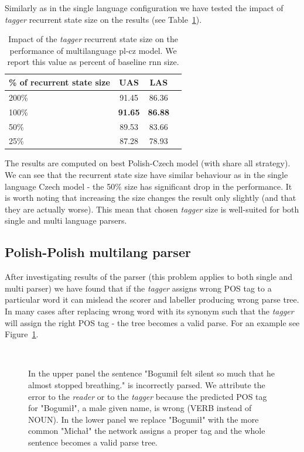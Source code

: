 Similarly as in the single language configuration we have tested the impact of \emph{tagger}
recurrent state size on the results (see Table~\ref{tab:birnn_multi_size}).

\begin{table}[!htbp]
    \centering
    \begin{tabular}{l c c c}
        \% of recurrent state size & UAS & LAS \\ \hline 
        200\% & 91.45 & 86.36\\
        100\% & \textbf{91.65} & \textbf{86.88}\\
        50\% & 89.53 & 83.66\\
        25\% & 87.28 & 78.93
    \end{tabular}
    \label{tab:birnn_multi_size}
    \caption{Impact of the \emph{tagger} recurrent state size on the performance
    of multilanguage pl-cz model.
    We report this value as percent of baseline rnn size.}
\end{table}

The results are computed on best Polish-Czech model (with share all strategy). We can see
that the recurrent state size have similar behaviour as in the single language Czech model - 
the 50\% size has significant drop in the performance. It is worth noting that
increasing the size changes the result only slightly (and that they are actually worse).
This mean that chosen \emph{tagger} size is well-suited for both single and multi
language parsers.

\subsection{Polish-Polish multilang parser}
After investigating results of the parser (this problem applies to both single
and multi parser) we have found that if the \emph{tagger} assigns wrong POS tag to
a particular word it can mislead the scorer and labeller producing wrong parse tree.
In many cases after replacing wrong word with its synonym such that the \emph{tagger}
will assign the right POS tag - the tree becomes a valid parse. For an example see Figure~\ref{fig:pos_bad_good}.

\begin{figure}[htbp]
  \centering
  \\[5pt]
  \caption{In the upper panel the sentence "Bogumił felt silent so
    much that he almost stopped breathing." is incorrectly parsed.
    We attribute the error to the \emph{reader} or to the \emph{tagger} because the predicted POS
    tag for "Bogumił", a male given name, is wrong (VERB instead of
    NOUN). In the lower panel we replace "Bogumił" with the  more common "Michał" the network assigns
    a proper tag and the whole sentence becomes a valid parse tree.} 
  \label{fig:pos_bad_good}
\end{figure}

